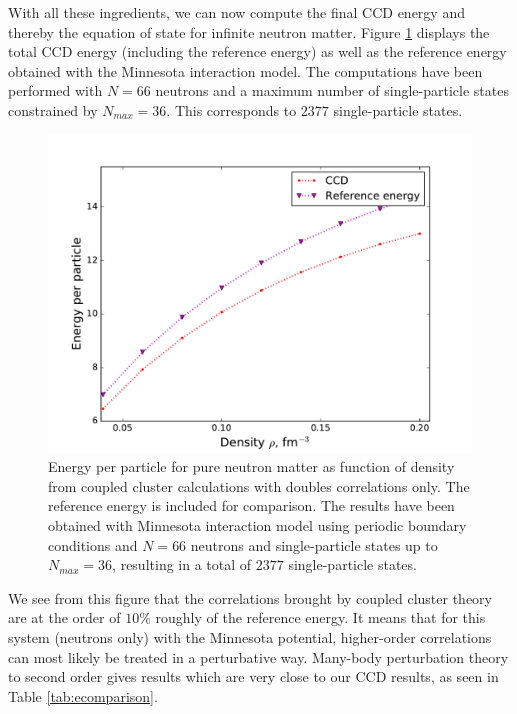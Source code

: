 With all these ingredients, we can now compute the final CCD energy and thereby the equation of state for infinite neutron matter.
Figure \ref{fig:finalccdenergy} displays the total CCD energy (including the reference energy) as well as the reference energy
obtained with the Minnesota interaction model. The computations have been performed with $N=66$ neutrons and a maximum number of single-particle states constrained by $N_{max}=36$. This corresponds to $2377$ single-particle states. 
  \begin{figure}
    \includegraphics[width=\linewidth]{Chapter8-figures/finalccenergy.pdf}
    \caption{Energy per particle for pure neutron matter as function of density from coupled cluster calculations with doubles correlations  only. The reference energy is included for comparison. The results have been obtained with Minnesota interaction model using periodic  boundary conditions and $N=66$ neutrons and single-particle states up to $N_{max}=36$, resulting in a total of $2377$ single-particle states. }  
    \label{fig:finalccdenergy}
  \end{figure}
We see from this figure that the correlations brought by coupled cluster theory are at the order of $10\%$ roughly of the reference energy. It means that for this system (neutrons only) with the Minnesota potential, higher-order correlations can most likely be treated in a perturbative way. Many-body perturbation theory to second order gives results which are very close to our CCD results, as seen in 
Table \ref{tab:ecomparison}.
